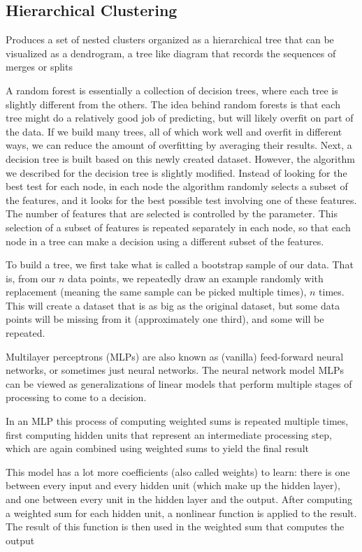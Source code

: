 \documentclass[12pt]{amsart}
\begin{document}
\subsection{Hierarchical Clustering}
Produces a set of nested clusters organized as a
hierarchical tree that can be visualized as a dendrogram, a tree like diagram that records the sequences of
merges or splits







A random forest is essentially a collection of decision trees, where each tree is slightly different from the others. The idea behind random forests is that each tree might do a relatively good job of predicting, but will likely overfit on part of the data. If we build many trees, all of which work well and overfit in different ways, we can reduce the amount of overfitting by averaging their results. 
Next, a decision tree is built based on this newly created dataset. However, the algorithm we described for the decision tree is slightly modified. Instead of looking for the best test for each node, in each node the algorithm randomly selects a subset of the features, and it looks for the best possible test involving one of these features. The number of features that are selected is controlled by the parameter. This selection of a subset of features is repeated separately in each node, so that each node in a tree can make a decision using a different subset of the features.



To build a tree, we first take what is called a bootstrap sample of our data. That is, from our $n$ data points, we repeatedly draw an example randomly with replacement (meaning the same sample can be picked multiple times), $n$ times. This will create a dataset that is as big as the original dataset, but some data points will be missing from it (approximately one third), and some will be repeated.




Multilayer perceptrons (MLPs) are also known as (vanilla) feed-forward neural networks, or sometimes just neural networks.
The neural network model
MLPs can be viewed as generalizations of linear models that perform multiple stages of processing to come to a decision.

In an MLP this process of computing weighted sums is repeated multiple times, first computing hidden units that represent an intermediate processing step, which are again combined using weighted sums to yield the final result

This model has a lot more coefficients (also called weights) to learn: there is one between every input and every hidden unit (which make up the hidden layer), and one between every unit in the hidden layer and the output. After computing a weighted sum for each hidden unit, a nonlinear function is applied to the result. The result of this function is then used in the weighted sum that computes the output
\end{document}
